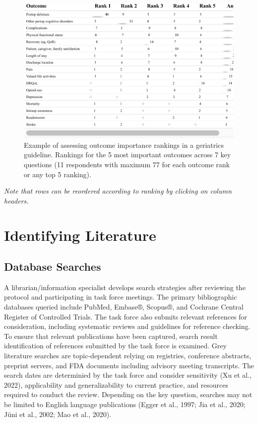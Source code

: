 \documentclass[
  letterpaper,
  DIV=11,
  numbers=noendperiod]{scrreprt}
\begin{document}
\begin{figure}

\caption{\label{fig-priority_geri}Example of assessing outcome
importance rankings in a geriatrics guideline. Rankings for the 5 most
important outcomes across 7 key questions (11 respondents with maximum
77 for each outcome rank or any top 5 ranking).}

{\centering \includegraphics{03_syst_rev_files/figure-pdf/fig-priority_geri-1.pdf}

}

\end{figure}

\emph{Note that rows can be reordered according to ranking by clicking
on column headers.}

\hypertarget{identifying-literature}{%
\section{Identifying Literature}\label{identifying-literature}}

\hypertarget{database-searches}{%
\subsection{Database Searches}\label{database-searches}}

A librarian/information specialist develops search strategies after
reviewing the protocol and participating in task force meetings. The
primary bibliographic databases queried include PubMed, Embase®,
Scopus®, and Cochrane Central Register of Controlled Trials. The task
force also submits relevant references for consideration, including
systematic reviews and guidelines for reference checking. To ensure that
relevant publications have been captured, search result identification
of references submitted by the task force is examined. Grey literature
searches are topic-dependent relying on registries, conference
abstracts, preprint servers, and FDA documents including advisory
meeting transcripts. The search dates are determinied by the task force
and consider sensitivity (Xu et al., 2022), applicability and
generalizability to current practice, and resources required to conduct
the review. Depending on the key question, searches may not be limited
to English language publications (Egger et al., 1997; Jia et al., 2020;
Jüni et al., 2002; Mao et al., 2020).
\end{document}
